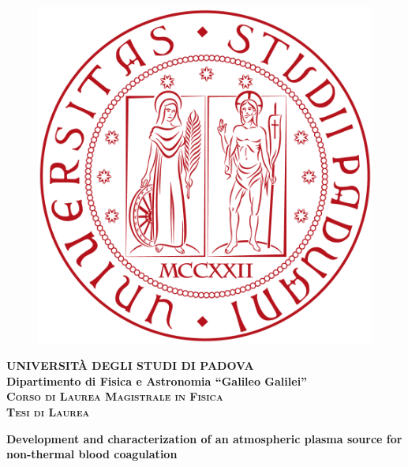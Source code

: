 \documentclass[twoside,openright,titlepage,headings,footinclude=true,cleardoublepage=empty,BCOR=5mm,11pt,a4paper,english]{book}
\begin{document}
\begin{titlepage}
\vspace{5mm}
\begin{figure}[hbtp]
\centering
\includegraphics[scale=.13]{Images/UnipdLogo.png}
\end{figure}
\vspace{5mm}
\begin{center}
{{\huge{\textsc{\bf UNIVERSIT\`A DEGLI STUDI DI PADOVA}}}\\}
\vspace{5mm}
{\Large{\bf Dipartimento di Fisica e Astronomia ``Galileo Galilei''}} \\
\vspace{5mm}
{\Large{\textsc{\bf Corso di Laurea Magistrale in Fisica}}}\\
\vspace{15mm}
{\Large{\textsc{\bf Tesi di Laurea}}}\\
\vspace{15mm}
\begin{spacing}{3}
{\LARGE \textbf{Development and characterization of an atmospheric plasma source for non-thermal blood coagulation​}}\\
\end{spacing}
\vspace{5mm}
\end{center}


\end{titlepage}
\end{document}
